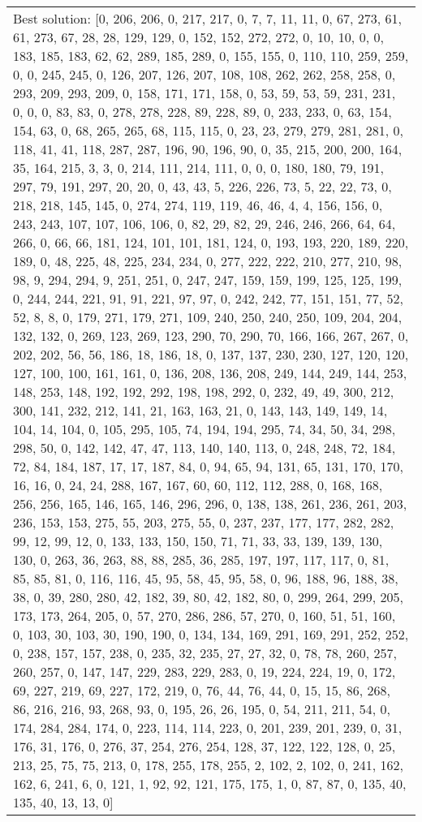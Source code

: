 \documentclass[]{article}
\begin{document}
\begin{table}[!ht]
\begin{tabular}{|m{3.2cm}|>{\centering\arraybackslash}m{2.8cm}|>{\centering\arraybackslash}m{2.8cm}|>{\centering\arraybackslash}m{2.8cm}|>{\centering\arraybackslash}m{2.8cm}|}
		\multicolumn{5}{|m{14cm}|}{Best solution: [0, 206, 206, 0, 217, 217, 0, 7, 7, 11, 11, 0, 67, 273, 61, 61, 273, 67, 28, 28, 129, 129, 0, 152, 152, 272, 272, 0, 10, 10, 0, 0, 183, 185, 183, 62, 62, 289, 185, 289, 0, 155, 155, 0, 110, 110, 259, 259, 0, 0, 245, 245, 0, 126, 207, 126, 207, 108, 108, 262, 262, 258, 258, 0, 293, 209, 293, 209, 0, 158, 171, 171, 158, 0, 53, 59, 53, 59, 231, 231, 0, 0, 0, 83, 83, 0, 278, 278, 228, 89, 228, 89, 0, 233, 233, 0, 63, 154, 154, 63, 0, 68, 265, 265, 68, 115, 115, 0, 23, 23, 279, 279, 281, 281, 0, 118, 41, 41, 118, 287, 287, 196, 90, 196, 90, 0, 35, 215, 200, 200, 164, 35, 164, 215, 3, 3, 0, 214, 111, 214, 111, 0, 0, 0, 180, 180, 79, 191, 297, 79, 191, 297, 20, 20, 0, 43, 43, 5, 226, 226, 73, 5, 22, 22, 73, 0, 218, 218, 145, 145, 0, 274, 274, 119, 119, 46, 46, 4, 4, 156, 156, 0, 243, 243, 107, 107, 106, 106, 0, 82, 29, 82, 29, 246, 246, 266, 64, 64, 266, 0, 66, 66, 181, 124, 101, 101, 181, 124, 0, 193, 193, 220, 189, 220, 189, 0, 48, 225, 48, 225, 234, 234, 0, 277, 222, 222, 210, 277, 210, 98, 98, 9, 294, 294, 9, 251, 251, 0, 247, 247, 159, 159, 199, 125, 125, 199, 0, 244, 244, 221, 91, 91, 221, 97, 97, 0, 242, 242, 77, 151, 151, 77, 52, 52, 8, 8, 0, 179, 271, 179, 271, 109, 240, 250, 240, 250, 109, 204, 204, 132, 132, 0, 269, 123, 269, 123, 290, 70, 290, 70, 166, 166, 267, 267, 0, 202, 202, 56, 56, 186, 18, 186, 18, 0, 137, 137, 230, 230, 127, 120, 120, 127, 100, 100, 161, 161, 0, 136, 208, 136, 208, 249, 144, 249, 144, 253, 148, 253, 148, 192, 192, 292, 198, 198, 292, 0, 232, 49, 49, 300, 212, 300, 141, 232, 212, 141, 21, 163, 163, 21, 0, 143, 143, 149, 149, 14, 104, 14, 104, 0, 105, 295, 105, 74, 194, 194, 295, 74, 34, 50, 34, 298, 298, 50, 0, 142, 142, 47, 47, 113, 140, 140, 113, 0, 248, 248, 72, 184, 72, 84, 184, 187, 17, 17, 187, 84, 0, 94, 65, 94, 131, 65, 131, 170, 170, 16, 16, 0, 24, 24, 288, 167, 167, 60, 60, 112, 112, 288, 0, 168, 168, 256, 256, 165, 146, 165, 146, 296, 296, 0, 138, 138, 261, 236, 261, 203, 236, 153, 153, 275, 55, 203, 275, 55, 0, 237, 237, 177, 177, 282, 282, 99, 12, 99, 12, 0, 133, 133, 150, 150, 71, 71, 33, 33, 139, 139, 130, 130, 0, 263, 36, 263, 88, 88, 285, 36, 285, 197, 197, 117, 117, 0, 81, 85, 85, 81, 0, 116, 116, 45, 95, 58, 45, 95, 58, 0, 96, 188, 96, 188, 38, 38, 0, 39, 280, 280, 42, 182, 39, 80, 42, 182, 80, 0, 299, 264, 299, 205, 173, 173, 264, 205, 0, 57, 270, 286, 286, 57, 270, 0, 160, 51, 51, 160, 0, 103, 30, 103, 30, 190, 190, 0, 134, 134, 169, 291, 169, 291, 252, 252, 0, 238, 157, 157, 238, 0, 235, 32, 235, 27, 27, 32, 0, 78, 78, 260, 257, 260, 257, 0, 147, 147, 229, 283, 229, 283, 0, 19, 224, 224, 19, 0, 172, 69, 227, 219, 69, 227, 172, 219, 0, 76, 44, 76, 44, 0, 15, 15, 86, 268, 86, 216, 216, 93, 268, 93, 0, 195, 26, 26, 195, 0, 54, 211, 211, 54, 0, 174, 284, 284, 174, 0, 223, 114, 114, 223, 0, 201, 239, 201, 239, 0, 31, 176, 31, 176, 0, 276, 37, 254, 276, 254, 128, 37, 122, 122, 128, 0, 25, 213, 25, 75, 75, 213, 0, 178, 255, 178, 255, 2, 102, 2, 102, 0, 241, 162, 162, 6, 241, 6, 0, 121, 1, 92, 92, 121, 175, 175, 1, 0, 87, 87, 0, 135, 40, 135, 40, 13, 13, 0]}\\

\end{tabular}
\end{table}
\end{document}
